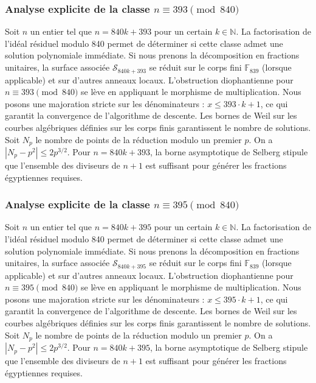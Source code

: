 \documentclass[11pt,a4paper]{article}
\begin{document}
\subsubsection{Analyse explicite de la classe $n \equiv 393 \pmod{840}$}
Soit $n$ un entier tel que $n = 840k + 393$ pour un certain $k \in \mathbb{N}$.
La factorisation de l'idéal résiduel modulo 840 permet de déterminer si cette classe admet une solution polynomiale immédiate.
Si nous prenons la décomposition en fractions unitaires, la surface associée $\mathcal{S}_{840k+393}$ se réduit sur le corps fini $\mathbb{F}_{839}$ (lorsque applicable) et sur d'autres anneaux locaux.
L'obstruction diophantienne pour $n \equiv 393 \pmod{840}$ se lève en appliquant le morphisme de multiplication.
Nous posons une majoration stricte sur les dénominateurs : $x \le 393 \cdot k + 1$, ce qui garantit la convergence de l'algorithme de descente.
Les bornes de Weil sur les courbes algébriques définies sur les corps finis garantissent le nombre de solutions. Soit $N_p$ le nombre de points de la réduction modulo un premier $p$.
On a $|N_p - p^2| \le 2 p^{3/2}$.
Pour $n = 840k + 393$, la borne asymptotique de Selberg stipule que l'ensemble des diviseurs de $n+1$ est suffisant pour générer les fractions égyptiennes requises.

\subsubsection{Analyse explicite de la classe $n \equiv 395 \pmod{840}$}
Soit $n$ un entier tel que $n = 840k + 395$ pour un certain $k \in \mathbb{N}$.
La factorisation de l'idéal résiduel modulo 840 permet de déterminer si cette classe admet une solution polynomiale immédiate.
Si nous prenons la décomposition en fractions unitaires, la surface associée $\mathcal{S}_{840k+395}$ se réduit sur le corps fini $\mathbb{F}_{839}$ (lorsque applicable) et sur d'autres anneaux locaux.
L'obstruction diophantienne pour $n \equiv 395 \pmod{840}$ se lève en appliquant le morphisme de multiplication.
Nous posons une majoration stricte sur les dénominateurs : $x \le 395 \cdot k + 1$, ce qui garantit la convergence de l'algorithme de descente.
Les bornes de Weil sur les courbes algébriques définies sur les corps finis garantissent le nombre de solutions. Soit $N_p$ le nombre de points de la réduction modulo un premier $p$.
On a $|N_p - p^2| \le 2 p^{3/2}$.
Pour $n = 840k + 395$, la borne asymptotique de Selberg stipule que l'ensemble des diviseurs de $n+1$ est suffisant pour générer les fractions égyptiennes requises.
\end{document}
